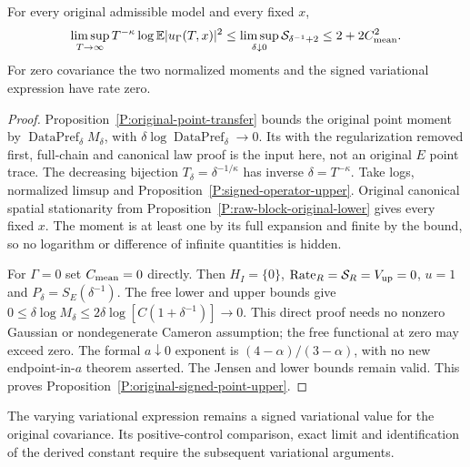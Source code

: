 \begin{proposition}
  \label{P:original-signed-point-upper}
  For every original admissible model and every fixed $x$,
  \[
    \limsup_{T\to\infty}T^{-\kappa}
    \log\mathbb{E}|u_\Gamma(T,x)|^2
    \le\limsup_{\delta\downarrow0}\mathcal{S}_{\delta^{-1}+2}
    \le2+2C_{\rm mean}^2 .
  \]
  For zero covariance the two normalized moments and the signed variational
  expression have rate zero.
\end{proposition}

\begin{proof}
  Proposition~\ref{P:original-point-transfer} bounds the original point moment
  by $\operatorname{DataPref}_\delta M_\delta$, with
  $\delta\log\operatorname{DataPref}_\delta \to 0$. Its with the regularization
  removed first, full-chain and canonical law proof is the input here, not an
  original $E$ point trace. The decreasing bijection $T_\delta =
  \delta^{-1/\kappa}$ has inverse $\delta = T^{-\kappa}$. Take logs, normalized
  limsup and Proposition~\ref{P:signed-operator-upper}. Original canonical
  spatial stationarity from Proposition~\ref{P:raw-block-original-lower} gives
  every fixed $x$. The moment is at least one by its full expansion and finite
  by the bound, so no logarithm or difference of infinite quantities is hidden.

  For $\Gamma = 0$ set $C_{\rm mean} = 0$ directly. Then $H_I = \{0\}$,
  $\operatorname{Rate}_R = \mathcal{S}_R = V_{\rm up} = 0$, $u = 1$ and
  $P_\delta = S_E(\delta^{-1})$. The free lower and upper bounds give $0 \le
  \delta\log M_\delta \le 2\delta\log[C(1+\delta^{-1})] \to 0$. This direct
  proof needs no nonzero Gaussian or nondegenerate Cameron assumption; the free
  functional at zero may exceed zero. The formal $a\downarrow0$ exponent is
  $(4-\alpha)/(3-\alpha)$, with no new endpoint-in-$a$ theorem asserted. The
  Jensen and lower bounds remain valid. This proves
  Proposition~\ref{P:original-signed-point-upper}.
\end{proof}

The varying variational expression remains a signed variational value for the
original covariance. Its positive-control comparison, exact limit and
identification of the derived constant require the subsequent variational
arguments.
